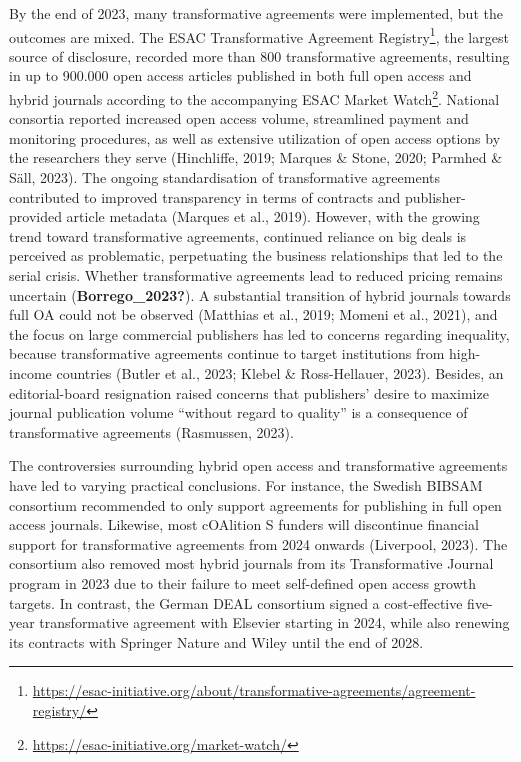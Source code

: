 \documentclass[a4paper,man,floatsintext,longtable,noextraspace,12pt]{apa6}
\begin{document}
By the end of 2023, many transformative agreements were implemented, but
the outcomes are mixed. The ESAC Transformative Agreement
Registry\footnote{\url{https://esac-initiative.org/about/transformative-agreements/agreement-registry/}},
the largest source of disclosure, recorded more than 800 transformative
agreements, resulting in up to 900.000 open access articles published in
both full open access and hybrid journals according to the accompanying
ESAC Market Watch\footnote{\url{https://esac-initiative.org/market-watch/}}.
National consortia reported increased open access volume, streamlined
payment and monitoring procedures, as well as extensive utilization of
open access options by the researchers they serve (Hinchliffe, 2019;
Marques \& Stone, 2020; Parmhed \& Säll, 2023). The ongoing
standardisation of transformative agreements contributed to improved
transparency in terms of contracts and publisher-provided article
metadata (Marques et al., 2019). However, with the growing trend toward
transformative agreements, continued reliance on big deals is perceived
as problematic, perpetuating the business relationships that led to the
serial crisis. Whether transformative agreements lead to reduced pricing
remains uncertain (\textbf{Borrego\_2023?}). A substantial transition of
hybrid journals towards full OA could not be observed (Matthias et al.,
2019; Momeni et al., 2021), and the focus on large commercial publishers
has led to concerns regarding inequality, because transformative
agreements continue to target institutions from high-income countries
(Butler et al., 2023; Klebel \& Ross-Hellauer, 2023). Besides, an
editorial-board resignation raised concerns that publishers' desire to
maximize journal publication volume ``without regard to quality'' is a
consequence of transformative agreements (Rasmussen, 2023).

The controversies surrounding hybrid open access and transformative
agreements have led to varying practical conclusions. For instance, the
Swedish BIBSAM consortium recommended to only support agreements for
publishing in full open access journals. Likewise, most cOAlition S
funders will discontinue financial support for transformative agreements
from 2024 onwards (Liverpool, 2023). The consortium also removed most
hybrid journals from its Transformative Journal program in 2023 due to
their failure to meet self-defined open access growth targets. In
contrast, the German DEAL consortium signed a cost-effective five-year
transformative agreement with Elsevier starting in 2024, while also
renewing its contracts with Springer Nature and Wiley until the end of
2028.
\end{document}
